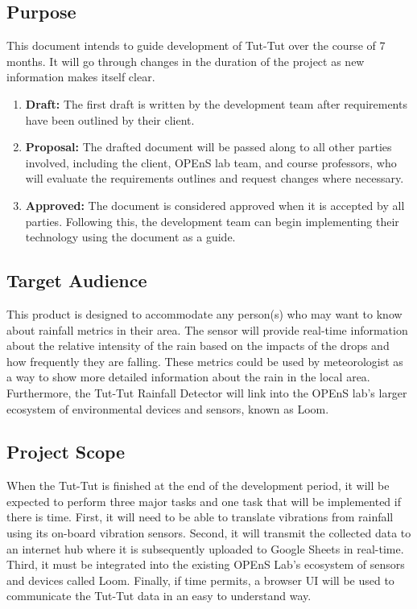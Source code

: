 \documentclass[letterpaper,10pt,draftclsnofoot,onecolumn]{article}
\begin{document}
\subsection{Purpose}
This document intends to guide development of Tut-Tut over the course of 7 months. It will go through changes in the duration of the project as new information makes itself clear.

\begin{enumerate}
    \item \textbf{Draft:}  The first draft is written by the development team after requirements have been outlined by their client. 
    \item \textbf{Proposal:} The drafted document will be passed along to all other parties involved, including the client, OPEnS lab team, and course professors, who will evaluate the requirements outlines and request changes where necessary.
    \item \textbf{Approved:} The document is considered approved when it is accepted by all parties. Following this, the development team can begin implementing their technology using the document as a guide.
\end{enumerate}

\subsection{Target Audience}
This product is designed to accommodate any person(s) who may want to know about rainfall metrics in their area. The sensor will provide real-time information about the relative intensity of the rain based on the impacts of the drops and how frequently they are falling. These metrics could be used by meteorologist as a way to show more detailed information about the rain in the local area. Furthermore, the Tut-Tut Rainfall Detector will link into the OPEnS lab's larger ecosystem of environmental devices and sensors, known as Loom.

\subsection{Project Scope}
When the Tut-Tut is finished at the end of the development period, it will be expected to perform three major tasks and one task that will be implemented if there is time. First, it will need to be able to translate vibrations from rainfall using its on-board vibration sensors. Second, it will transmit the collected data to an internet hub where it is subsequently uploaded to Google Sheets in real-time. Third, it must be integrated into the existing OPEnS Lab's ecosystem of sensors and devices called Loom. Finally, if time permits, a browser UI will be used to communicate the Tut-Tut data in an easy to understand way.
\end{document}
